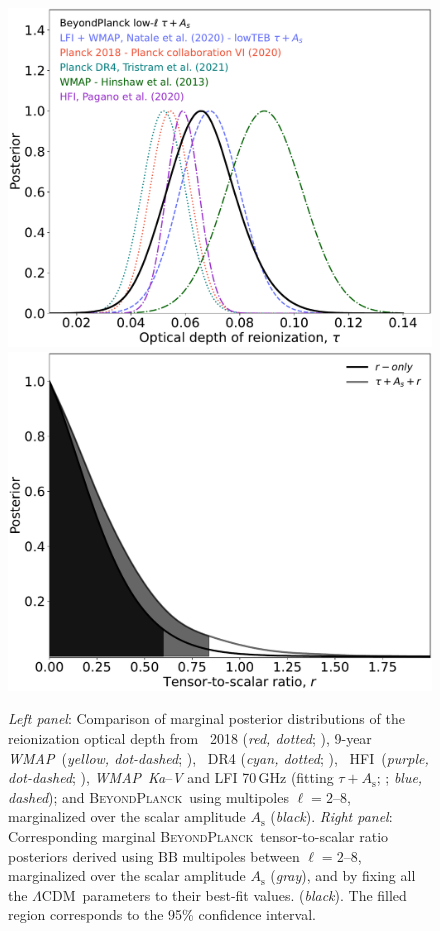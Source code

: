 \documentclass[twocolumn]{aa}
\def\WMAP{\textit{WMAP}}
\def\LCDM{$\Lambda$CDM}
\newcommand{\BP}{\textsc{BeyondPlanck}}
\newcommand{\hfi}[0]{HFI}
\begin{document}
\begin{figure}[t]
  \center
  \includegraphics[width=0.49\linewidth]{figs/BP10_tau_post.pdf} 
  \includegraphics[width=0.49\linewidth]{figs/BP10_r_post.pdf}  
  \caption{\emph{Left panel}: Comparison of marginal posterior
    distributions of the reionization optical depth from \Planck\ 2018
    (\emph{red, dotted}; \citealp{planck2016-l06}), 9-year
    \WMAP\ (\emph{yellow, dot-dashed}; \citealp{hinshaw2012}),
    \Planck\ DR4 (\emph{cyan, dotted}; \citealp{tristram:2021}),
    \Planck\ \hfi\ (\emph{purple, dot-dashed}; \citealp{pagano:2020}),
    \WMAP\ \emph{Ka}--\emph V and LFI 70\,GHz (fitting $\tau +
    A_{\mathrm s}$; \citealp{natale:2020}; \emph{blue, dashed}); and
    \BP\ using multipoles $\ell=2$--8, marginalized over the scalar
    amplitude $A_{\mathrm s}$ (\emph{black}).  \emph{Right panel}:
    Corresponding marginal \BP\ tensor-to-scalar ratio posteriors
    derived using $\mathrm{BB}$ multipoles between $\ell=2$--8,
    marginalized over the scalar amplitude $A_{\mathrm s}$
    (\emph{gray}), and by fixing all the \LCDM\ parameters to their
    best-fit values. (\emph{black}). The filled region corresponds to
    the 95\% confidence interval.}
    \label{fig:tau}
\end{figure}
\end{document}
